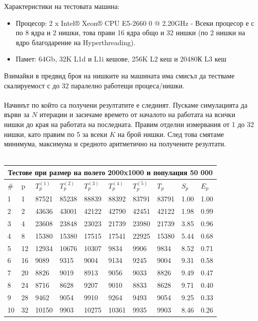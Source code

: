 \documentclass{article}
\begin{document}
Характеристики на тестовата машина: 
\begin{itemize}
	\item Процесор: 2 x Intel® Xeon® CPU E5-2660 0 @ 2.20GHz - Всеки процесор е с по 8 ядра и 2 нишки,
	това прави 16 ядра общо и 32 нишки (по 2 нишки на ядро благодарение на Hyperthreading).
	\item Памет: 64Gb, 32K L1d и L1i кешове, 256K L2 кеш и 20480К L3 кеш
\end{itemize}
Взимайки в предвид броя на нишките на машината има смисъл да тестваме скалируемост с до 32 паралелно работещи процеса/нишки.
\\
\\
Начинът по който са получени резултатите е следният. Пускаме симулацията да върви за $N$ итерации
и засичаме времето от началото на работата на всички нишки до края на работата на последната.
Правим отделни измервания от 1 до 32 нишки, като правим по 5 за всеки $K$ на брой нишки. След това
смятаме минимума, максимума и средното аритметично на получените резултати.
\\
\\
\begin{tabular}{ |p{0.6cm}||p{0.8cm}|p{0.8cm}|p{0.8cm}|p{0.8cm}|p{0.8cm}|p{0.8cm}|p{0.8cm}|p{0.8cm}|p{0.8cm}| }
 \hline
 \multicolumn{10}{|c|}{Тестове при размер на полето 2000x1000 и популация 50 000} \\
 \hline
 \# & p & $T^{(1)}_p$ & $T^{(2)}_p$ & $T^{(3)}_p$ & $T^{(4)}_p$ & $T^{(5)}_p$ & $T_p$ & $S_p$ & $E_p$ \\
 \hline
1  & 1  & 87521 & 85238 & 88839 & 88392 & 83791 & 83791 & 1.00 & 1.00 \\
2  & 2  & 43636 &  43001 & 42122 & 42790 & 42451 & 42122 & 1.98 & 0.99 \\
3  & 4  & 23608 & 23848 & 23023 & 21739 & 23980 & 21739 & 3.85 & 0.96 \\
4  & 8  & 15380 & 15380 & 17515 & 17541 & 22925 & 15380 & 5.44 & 0.68 \\
5  & 12 & 12934 & 10676 & 10307 & 9834 & 9906 & 9834 & 8.52 & 0.71 \\
6  & 16 & 9089 & 9315 & 9004 & 9134 & 9245 & 9004 & 9.31 & 0.58 \\
7  & 20 & 8826 & 9019 & 8913 & 9056 & 9033 & 8826 & 9.49 & 0.47 \\
8  & 24 & 8716 & 8628 & 9207 & 9010 & 8833 & 8628 & 9.71 & 0.40 \\
9  & 28 & 9462 & 9054 & 9910 & 9264 & 9493 & 9054 & 9.25 & 0.33 \\
10 & 32 & 10150 & 9903 & 10275 & 10361 & 9935 & 9903 & 8.46 & 0.26 \\
 \hline
\end{tabular}
\end{document}
